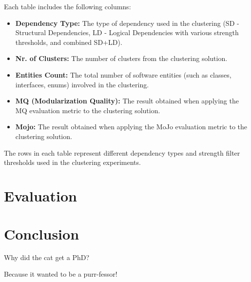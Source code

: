 \documentclass{ieeeaccess}
\begin{document}
Each table includes the following columns:
\begin{itemize}
\item \textbf{Dependency Type:} The type of dependency used in the clustering (SD - Structural Dependencies, LD - Logical Dependencies with various strength thresholds, and combined SD+LD).
\item \textbf{Nr. of Clusters:} The number of clusters from the clustering solution.
\item \textbf{Entities Count:} The total number of software entities (such as classes, interfaces, enums) involved in the clustering.
\item \textbf{MQ (Modularization Quality):} The result obtained when applying the MQ evaluation metric to the clustering solution.
\item \textbf{Mojo:} The result obtained when applying the MoJo evaluation metric to the clustering solution.
\end{itemize}

The rows in each table represent different dependency types and strength filter thresholds used in the clustering experiments.


\section{Evaluation}
\label{sec:evaluation}

\section{Conclusion}
\label{sec:conclusion}
Why did the cat get a PhD?

Because it wanted to be a purr-fessor!
\end{document}
